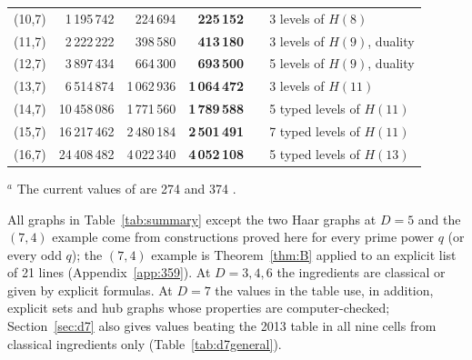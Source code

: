\documentclass[11pt]{amsart}
\theoremstyle{definition}
\theoremstyle{remark}
\numberwithin{equation}{section}
\begin{document}
\begin{longtable}{@{}l r r r l l@{}}
(10,7) & 1\,195\,742 & 224\,694 & \textbf{225\,152} & & 3 levels of $H(8)$ \\
(11,7) & 2\,222\,222 & 398\,580 & \textbf{413\,180} & & 3 levels of $H(9)$, duality \\
(12,7) & 3\,897\,434 & 664\,300 & \textbf{693\,500} & & 5 levels of $H(9)$, duality \\
(13,7) & 6\,514\,874 & 1\,062\,936 & \textbf{1\,064\,472} & & 3 levels of $H(11)$ \\
(14,7) & 10\,458\,086 & 1\,771\,560 & \textbf{1\,789\,588} & & 5 typed levels of $H(11)$ \\
(15,7) & 16\,217\,462 & 2\,480\,184 & \textbf{2\,501\,491} & & 7 typed levels of $H(11)$ \\
(16,7) & 24\,408\,482 & 4\,022\,340 & \textbf{4\,052\,108} & & 5 typed levels of $H(13)$ \\
\end{longtable}
\noindent $^a$ The current values of \cite{CW} are 274 and 374 \cite{AL20}.

All graphs in Table~\ref{tab:summary} except the two Haar graphs at $D=5$ and the $(7,4)$ example come from constructions
proved here for every prime power $q$ (or every odd $q$); the $(7,4)$ example is Theorem~\ref{thm:B} applied to an explicit
list of 21 lines (Appendix~\ref{app:359}). At $D=3,4,6$ the ingredients are classical or given by explicit formulas. At $D=7$ the values in the table use, in addition, explicit sets and
hub graphs whose properties are computer-checked; Section~\ref{sec:d7} also gives values beating the 2013 table in all nine
cells from classical ingredients only (Table~\ref{tab:d7general}).

\end{document}
